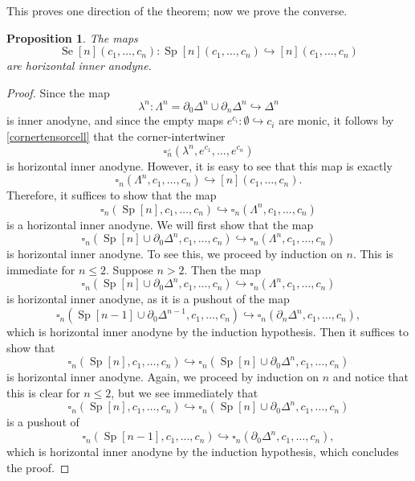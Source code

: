 \documentclass[leqno]{article}
\numberwithin{equation}{subsection}
\theoremstyle{plain}   %
\newtheorem{prop}[equation]{Proposition}
\theoremstyle{remark}
\theoremstyle{plain}
\begin{document}
This proves one direction of the theorem; now we prove the converse.
\begin{prop} The maps \[\operatorname{Se}[n](c_1,\dots,c_n):\operatorname{Sp}[n](c_1,\dots,c_n) \hookrightarrow [n](c_1,\dots,c_n)\] are horizontal inner anodyne.
\end{prop}
\begin{proof} 
	Since the map 
	\[\lambda^n: \Lambda^n=\partial_0 \Delta^n \cup \partial_n\Delta^n \hookrightarrow \Delta^n\]
	is inner anodyne, and since the empty maps \(e^{c_i}:\emptyset \hookrightarrow c_i\) are monic, it follows by \ref{cornertensorcell} that the corner-intertwiner 
	\[\square^\lrcorner_n(\lambda^n,e^{c_1},\dots,e^{c_n})\]
	is horizontal inner anodyne.  However, it is easy to see that this map is exactly \[\square_n(\Lambda^n,c_1,\dots,c_n) \hookrightarrow [n](c_1,\dots,c_n).\]  Therefore, it suffices to show that the map 
	\[\square_n(\operatorname{Sp}[n],c_1,\dots,c_n) \hookrightarrow \square_n(\Lambda^n,c_1,\dots,c_n)\] is a horizontal inner anodyne.  We will first show that the map 
	\[\square_n(\operatorname{Sp}[n]\cup \partial_0\Delta^n,c_1,\dots,c_n) \hookrightarrow \square_n(\Lambda^n,c_1,\dots,c_n)\] is horizontal inner anodyne.  
	To see this, we proceed by induction on \(n\).  This is immediate for \(n\leq 2\). Suppose \(n>2\).  Then the map 
	\[\square_n(\operatorname{Sp}[n]\cup \partial_0\Delta^n,c_1,\dots,c_n) \hookrightarrow \square_n(\Lambda^n,c_1,\dots,c_n)\] is horizontal inner anodyne, as it is a pushout of the map 
	\[\square_n(\operatorname{Sp}[n-1]\cup \partial_0\Delta^{n-1},c_1,\dots,c_n) \hookrightarrow \square_n(\partial_n \Delta^n,c_1,\dots,c_n),\]
	which is horizontal inner anodyne by the induction hypothesis.  Then it suffices to show that 
	\[\square_n(\operatorname{Sp}[n],c_1,\dots,c_n) \hookrightarrow \square_n(\operatorname{Sp}[n]\cup \partial_0\Delta^n,c_1,\dots,c_n)\] is horizontal inner anodyne.  Again, we proceed by induction on \(n\) and notice that this is clear for \(n\leq 2\), but we see immediately that \[\square_n(\operatorname{Sp}[n],c_1,\dots,c_n) \hookrightarrow \square_n(\operatorname{Sp}[n]\cup \partial_0\Delta^n,c_1,\dots,c_n)\] is a pushout of 
	\[\square_n(\operatorname{Sp}[n-1],c_1,\dots,c_n) \hookrightarrow \square_n(\partial_0 \Delta^n ,c_1,\dots,c_n),\]
	which is horizontal inner anodyne by the induction hypothesis, which concludes the proof.
\end{proof}
\end{document}
